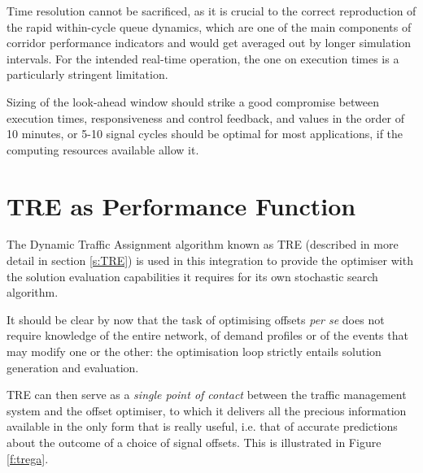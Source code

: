 Time resolution cannot be sacrificed, as it is crucial to the correct reproduction of the rapid within-cycle queue dynamics, which are one of the main components of corridor performance indicators and would get averaged out by longer simulation intervals. For the intended real-time operation, the one on execution times is a particularly stringent limitation.

Sizing of the look-ahead window should strike a good compromise between execution times, responsiveness and control feedback, and values in the order of 10 minutes, or 5-10 signal cycles should be optimal for most applications, if the computing resources available allow it.

\section{TRE as Performance Function} \label{s:rollingtre}
The Dynamic Traffic Assignment algorithm known as TRE (described in more detail in section \ref{s:TRE}) is used in this integration to provide the optimiser with the solution evaluation capabilities it requires for its own stochastic search algorithm.

It should be clear by now that the task of optimising offsets \emph{per se} does not require knowledge of the entire network, of demand profiles or of the events that may modify one or the other: the optimisation loop strictly entails solution generation and evaluation.

TRE can then serve as a \emph{single point of contact} between the traffic management system and the offset optimiser, to which it delivers all the precious information available in the only form that is really useful, i.e. that of accurate predictions about the outcome of a choice of signal offsets. This is illustrated in Figure \ref{f:trega}.


